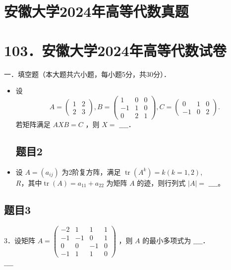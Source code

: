 \documentclass{article}
\begin{document}
\section*{安徽大学2024年高等代数真题}
\section*{103．安徽大学2024年高等代数试卷}
一．填空题（本大题共六小题，每小题5分，共30分）．

\begin{itemize}

\subsection{题目1}
  \item[1．] 设
\[
A=\left(\begin{array}{ll}
1 & 2 \\
2 & 3
\end{array}\right), B=\left(\begin{array}{ccc}
1 & 0 & 0 \\
-1 & 1 & 0 \\
0 & 2 & 1
\end{array}\right), C=\left(\begin{array}{ccc}
0 & 1 & 0 \\
-1 & 0 & 2
\end{array}\right) .
\]
若矩阵满足 \(A X B=C\) ，则 \(X=\) \(\_\_\_\_\)．

\subsection{题目2}
  \item[2．] 设 \(A=\left(a_{i j}\right)\) 为2阶复方阵，满足 \(\operatorname{tr}\left(A^{k}\right)=k(k=1,2)\),\(R ，其中 \operatorname{tr}(A)=a_{11}+a_{22}\) 为矩阵 \(A\) 的迹，则行列式 \(|A|=\) \(\_\_\_\_\)。
\end{itemize}

\subsection{题目3}
3．设矩阵 \(A=\left(\begin{array}{cccc}-2 & 1 & 1 & 1 \\ -1 & -1 & 0 & 1 \\ 0 & 0 & -1 & 0 \\ -1 & 1 & 1 & 0\end{array}\right)\) ，则 \(A\) 的最小多项式为 \(\_\_\_\_\)．\\
\(\_\_\_\_\)
\end{document}
